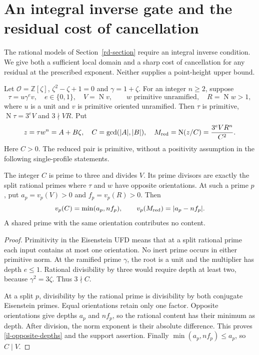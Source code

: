 \section{An integral inverse gate and the residual cost of cancellation}
\label{il-section}

The rational models of Section~\ref{rd-section} require an integral
inverse condition. We give both a sufficient local domain and a sharp
cost of cancellation for any residual at the prescribed exponent.
Neither supplies a point-height upper bound.

Let $\mathcal O=\mathbb Z[\zeta]$, $\zeta^2-\zeta+1=0$ and
$\gamma=1+\zeta$. For an integer $n\ge2$, suppose
\begin{equation}\label{il-input}
 \tau=u\gamma^e v,\quad e\in\{0,1\},\quad V=\operatorname N v,
 \qquad w\text{ primitive unramified},\quad R=\operatorname N w>1,
\end{equation}
where $u$ is a unit and $v$ is primitive oriented unramified.
Then $\tau$ is primitive, $\operatorname N\tau=3^eV$ and
$3\nmid VR$. Put
\begin{equation}\label{il-reduced}
 z=\tau w^n=A+B\zeta,\quad C=\gcd(|A|,|B|),\quad
 M_{\rm red}=\operatorname N(z/C)=\frac{3^eVR^n}{C^2}.
\end{equation}
Here $C>0$. The reduced pair is primitive, without a positivity
assumption in the following single-profile statements.

\begin{lemma}\label{il-content}
The integer $C$ is prime to three and divides $V$. Its prime divisors
are exactly the split rational primes where $\tau$ and $w$ have
opposite orientations. At such a prime $p$, put
$a_p=v_p(V)>0$ and $f_p=v_p(R)>0$. Then
\begin{equation}\label{il-opposite-depths}
 v_p(C)=\min(a_p,nf_p),\qquad
 v_p(M_{\rm red})=|a_p-nf_p|.
\end{equation}
A shared prime with the same orientation contributes no content.
\end{lemma}
\begin{proof}
Primitivity in the Eisenstein UFD means that at a split rational
prime each input contains at most one orientation. No inert prime
occurs in either primitive norm. At the ramified prime $\gamma$,
the root is a unit and the multiplier has depth $e\le1$.
Rational divisibility by three would require depth at least two,
because $\gamma^2=3\zeta$. Thus $3\nmid C$.

At a split $p$, divisibility by the rational prime is divisibility
by both conjugate Eisenstein primes. Equal orientations retain only
one factor. Opposite orientations give depths $a_p$ and $nf_p$,
so the rational content has their minimum as depth. After division,
the norm exponent is their absolute difference. This proves
\eqref{il-opposite-depths} and the support assertion. Finally
$\min(a_p,nf_p)\le a_p$, so $C\mid V$.
\end{proof}

